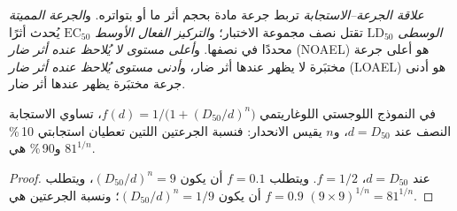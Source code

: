 \begin{definition}\label{def:b3:environmental-toxicology:dose}
\emph{علاقة الجرعة--الاستجابة} تربط
جرعة مادة بحجم أثر ما أو بتواتره. و\emph{الجرعة المميتة
الوسطى} $\mathrm{LD_{50}}$ تقتل نصف مجموعة الاختبار؛ 
و\emph{التركيز الفعال الأوسط} $\mathrm{EC_{50}}$
يُحدث أثرًا محددًا في نصفها. و\emph{أعلى مستوى لا يُلاحظ عنده أثر
ضار} (NOAEL) هو أعلى جرعة مختبَرة
لا يظهر عندها أثر ضار، و\emph{أدنى مستوى يُلاحظ عنده أثر
ضار} (LOAEL) هو أدنى جرعة مختبَرة
يظهر عندها أثر ضار.
\end{definition}

\begin{proposition}\label{prop:b3:environmental-toxicology:dose-response}
في النموذج اللوجستي اللوغاريتمي $f(d) = 1/\bigl(1 + (D_{50}/d)^n\bigr)$، تساوي الاستجابة النصف عند $d = D_{50}$، و$n$
يقيس الانحدار: فنسبة الجرعتين اللتين تعطيان استجابتي 10\,\% و90\,\% هي $81^{1/n}$.
\end{proposition}

\begin{proof}
عند $d = D_{50}$، $f = 1/2$. ويتطلب $f = 0.1$ أن يكون $(D_{50}/d)^n = 9$، ويتطلب $f = 0.9$ أن يكون $(D_{50}/d)^n = 1/9$؛ ونسبة الجرعتين
هي $(9 \times 9)^{1/n} = 81^{1/n}$.
\end{proof}


